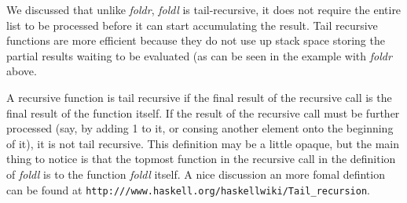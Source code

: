 \documentclass[11pt]{article}
\begin{document}





We discussed that unlike {\em{foldr}}, {\em{foldl}} is tail-recursive, it does
not require the entire list to be processed before it can start accumulating
the result.  Tail recursive functions are more efficient because they do not
use up stack space storing the partial results waiting to be evaluated (as can
be seen in the example with {\it{foldr}} above.


A recursive function is tail recursive if the final result of the recursive
call is the final result of the function itself. If the result of the recursive
call must be further processed (say, by adding 1 to it, or consing another
element onto the beginning of it), it is not tail recursive.  This definition
may be a little opaque, but the main thing to notice is that the topmost
function in the recursive call in the definition of {\it{foldl}} is to the
function {\it{foldl}} itself.  A nice discussion an more fomal defintion can be
found at {\tt{http:///www.haskell.org/haskellwiki/Tail\_recursion}}. 
\end{document}
